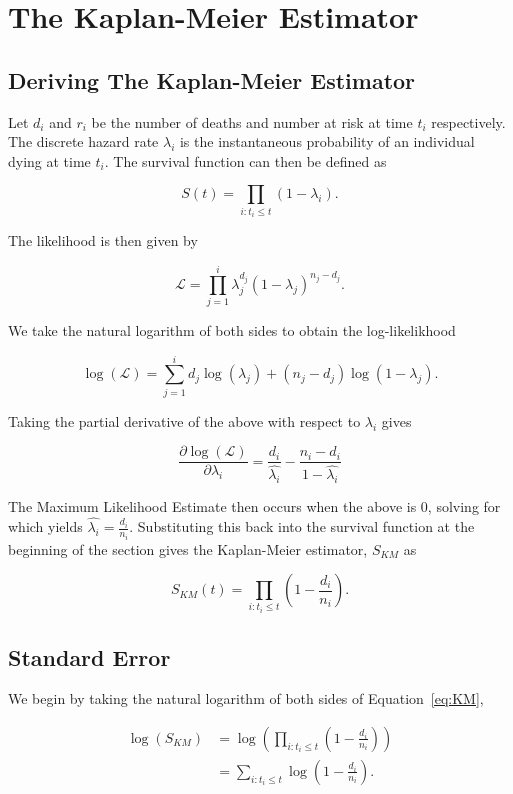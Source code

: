 \chapter{The Kaplan-Meier Estimator}\label{kmsec}

\section{Deriving The Kaplan-Meier Estimator}
Let $d_i$ and $r_i$ be the number of deaths and number at risk at time $t_i$ respectively. The discrete hazard rate $\lambda_i$ is the instantaneous probability of an individual dying at time $t_i$. The survival function can then be defined as 

\[
    S(t) = \prod_{i: t_i \leq t} (1 - \lambda_i).  
\]

The likelihood is then given by

\[
    \mathcal{L} = \prod^{i}_{j = 1} \lambda_j^{d_j}(1 - \lambda_j)^{n_j - d_j}. 
\]

We take the natural logarithm of both sides to obtain the log-likelikhood

\[
    \log(\mathcal{L}) = \sum_{j = 1}^i d_j\log(\lambda_j) + (n_j-d_j)\log(1-\lambda_j). 
\]

Taking the partial derivative of the above with respect to $\lambda_i$ gives

\[
    \frac{\partial \log(\mathcal{L})}{\partial \lambda_i}  = \frac{d_i}{\hat{\lambda_i}} - \frac{n_i - d_i}{1-\hat{\lambda_i}}  
\]

The Maximum Likelihood Estimate then occurs when the above is 0, solving for which yields $\hat{\lambda_i} = \frac{d_i}{n_i}$. Substituting this back into the survival function at the beginning of the section gives the Kaplan-Meier estimator, $S_{KM}$ as

\begin{equation}
    \label{eq:KM}
    S_{KM}(t) = \prod_{i: t_i \leq t} \left( 1 - \frac{d_i}{n_i} \right).
\end{equation}

\section{Standard Error}

We begin by taking the natural logarithm of both sides of Equation~\ref{eq:KM},

\begin{align*}
    \log(S_{KM}) &= \log \left( \prod_{i:t_i \leq t} \left(1 - \frac{d_i}{n_i} \right) \right) \\
                 &= \sum_{i:t_i \leq t} \log \left(1 - \frac{d_i}{n_i} \right).
\end{align*}

